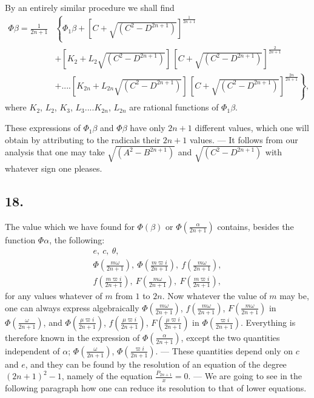 \documentclass{article}
\begin{document}
By an entirely similar procedure we shall find
\[ \begin{aligned}
\Phi\beta=\frac{1}{2n+1}&\left\{\Phi_{1}\beta+[C+\sqrt{(C^{2}-D^{2n+1})}]^{\frac{1}{2n+1}}\right.\\
&+[K_{2}+L_{2}\sqrt{(C^{2}-D^{2n+1})}]\,[C+\sqrt{(C^{2}-D^{2n+1})}]^{\frac{2}{2n+1}}\\
&\left.+....[K_{2n}+L_{2n}\sqrt{(C^{2}-D^{2n+1})}]\,[C+\sqrt{(C^{2}-D^{2n+1})}]^{\frac{2n}{2n+1}}\right\},
\end{aligned} \tag{88.} \]
where $K_{2}$, $L_{2}$, $K_{3}$, $L_{3}....K_{2n}$, $L_{2n}$ are rational functions of $\Phi_{1}\beta$.


These expressions of $\Phi_{1}\beta$ and $\Phi\beta$ have only $2n+1$ different values, which one will obtain by attributing to the radicals their $2n+1$ values. --- It follows from our analysis that one may take $\sqrt{(A^{2}-B^{2n+1})}$ and $\sqrt{(C^{2}-D^{2n+1})}$ with whatever sign one pleases.

\subsection*{18.}

The value which we have found for $\Phi(\beta)$ or $\Phi\left(\frac{\alpha}{2n+1}\right)$ contains, besides the function $\Phi\alpha$, the following:
\[ \begin{gathered}
e,\ c,\ \theta,\\
\Phi\left(\frac{m\omega}{2n+1}\right),\ \Phi\left(\frac{m\varpi i}{2n+1}\right),\ f\left(\frac{m\omega}{2n+1}\right),\\
f\left(\frac{m\varpi i}{2n+1}\right),\ F\left(\frac{m\omega}{2n+1}\right),\ F\left(\frac{m\varpi i}{2n+1}\right),
\end{gathered} \]
for any values whatever of $m$ from $1$ to $2n$. Now whatever the value of $m$ may be, one can always express algebraically $\Phi\left(\frac{m\omega}{2n+1}\right)$, $f\left(\frac{m\omega}{2n+1}\right)$, $F\left(\frac{m\omega}{2n+1}\right)$ in $\Phi\left(\frac{\omega}{2n+1}\right)$, and $\Phi\left(\frac{\mu\varpi i}{2n+1}\right)$, $f\left(\frac{\mu\varpi i}{2n+1}\right)$, $F\left(\frac{\mu\varpi i}{2n+1}\right)$ in $\Phi\left(\frac{\varpi i}{2n+1}\right)$. Everything is therefore known in the expression of $\Phi\left(\frac{\alpha}{2n+1}\right)$, except the two quantities independent of $\alpha$; $\Phi\left(\frac{\omega}{2n+1}\right)$, $\Phi\left(\frac{\varpi i}{2n+1}\right)$. --- These quantities depend only on $c$ and $e$, and they can be found by the resolution of an equation of the degree $(2n+1)^{2}-1$, namely of the equation $\frac{P_{2n+1}}{x}=0$. --- We are going to see in the following paragraph how one can reduce its resolution to that of lower equations.
\end{document}
